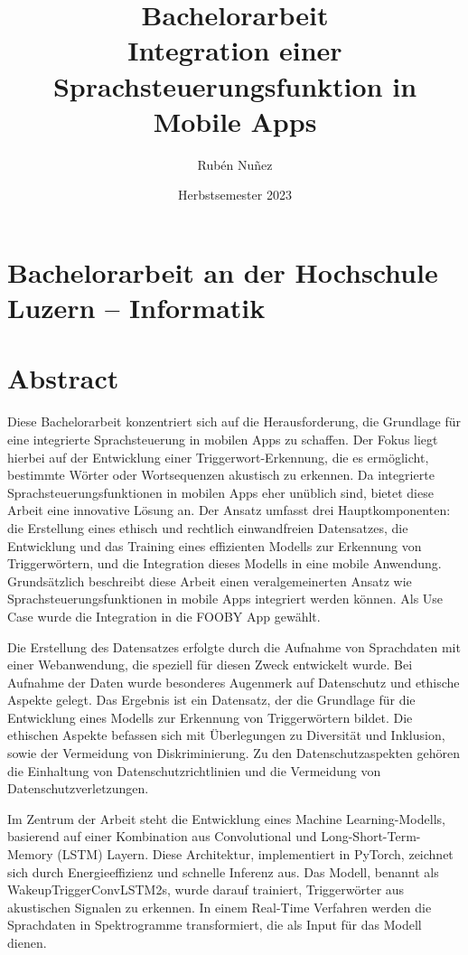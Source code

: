 \documentclass[11pt,a4paper]{article}
\title{
	{\LARGE Bachelorarbeit}\\[2em] 
	{\textbf{Integration einer Sprachsteuerungsfunktion {\break} in Mobile Apps}}
}
\author{Rubén Nuñez}
\date{Herbstsemester 2023}
\begin{document}
\maketitle
\thispagestyle{empty} %
\newpage

\section*{Bachelorarbeit an der Hochschule Luzern -- Informatik}

\newpage

\newpage \section*{Abstract}
Diese Bachelorarbeit konzentriert sich auf die Herausforderung, die Grundlage für eine integrierte 
Sprachsteuerung in mobilen Apps zu schaffen. Der Fokus liegt hierbei auf der Entwicklung einer 
Triggerwort-Erkennung, die es ermöglicht, bestimmte Wörter oder Wortsequenzen akustisch zu erkennen. Da integrierte Sprachsteuerungsfunktionen in mobilen Apps eher unüblich sind, 
bietet diese Arbeit eine innovative Lösung an. Der Ansatz umfasst drei Hauptkomponenten: die 
Erstellung eines ethisch und rechtlich einwandfreien Datensatzes, die Entwicklung und das Training 
eines effizienten Modells zur Erkennung von Triggerwörtern, und die Integration dieses Modells in 
eine mobile Anwendung. Grundsätzlich beschreibt diese Arbeit einen veralgemeinerten Ansatz wie 
Sprachsteuerungsfunktionen in mobile Apps integriert werden können. Als 
Use Case wurde die Integration in die FOOBY App gewählt.


\noindent \newline
Die Erstellung des Datensatzes erfolgte durch die Aufnahme von Sprachdaten mit einer Webanwendung, 
die speziell für diesen Zweck entwickelt wurde. Bei Aufnahme der Daten wurde besonderes Augenmerk 
auf Datenschutz und ethische Aspekte gelegt. Das Ergebnis ist ein Datensatz, der die Grundlage für 
die Entwicklung eines Modells zur Erkennung von Triggerwörtern bildet. Die ethischen Aspekte 
befassen sich mit Überlegungen zu Diversität und Inklusion, sowie der Vermeidung von Diskriminierung. 
Zu den Datenschutzaspekten gehören die Einhaltung von Datenschutzrichtlinien und die Vermeidung 
von Datenschutzverletzungen.


\noindent \newline
Im Zentrum der Arbeit steht die Entwicklung eines Machine Learning-Modells, basierend auf einer 
Kombination aus Convolutional und Long-Short-Term-Memory (LSTM) Layern. Diese Architektur, 
implementiert in PyTorch, zeichnet sich durch Energieeffizienz und schnelle Inferenz aus. Das 
Modell, benannt als WakeupTriggerConvLSTM2s, wurde darauf trainiert, Triggerwörter aus 
akustischen Signalen zu erkennen. In einem Real-Time Verfahren werden die Sprachdaten in 
Spektrogramme transformiert, die als Input für das Modell dienen. 
\end{document}
